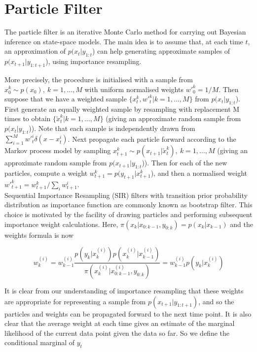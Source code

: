 \documentclass[11pt,a4,twosided,singlespacing,titlepagenumber=on]{scrreprt}
\numberwithin{equation}{chapter} %
\theoremstyle{remark}
\begin{document}
\section{Particle Filter}

The particle filter is an iterative Monte Carlo method for carrying out Bayesian inference on state-space models. The main idea is to assume that, at each time $t$, an approximation of $p(x_t|y_{1:t}$) can help generating approximate samples of $p(x_{t+1}|y_{1:t+1}$), using importance resampling.


More precisely, the procedure is initialised with a sample from $x_0^k \sim p(x_0),\ k=1,\ldots,M$ with uniform normalised weights ${w'}_0^k=1/M$. Then suppose that we have a weighted sample $\{x_t^k,{w'}_t^k|k=1,\ldots,M\}$ from $p(x_t|y_{1:t}$). First generate an equally weighted sample by resampling with replacement M times to obtain $\{\tilde{x}_t^k|k=1,\ldots,M\}$ (giving an approximate random sample from $p(x_t|y_{1:t}$)). Note that each sample is independently drawn from $\sum_{i=1}^M {w'}_t^i\delta(x-x_t^i)$. Next propagate each particle forward according to the Markov process model by sampling $x_{t+1}^k\sim p(x_{t+1}|\tilde{x}_t^k),\ k=1,\ldots,M$ (giving an approximate random sample from $p(x_{t+1}|y_{1:t}$)). Then for each of the new particles, compute a weight $w_{t+1}^k=p(y_{t+1}|x_{t+1}^k$), and then a normalised weight ${w'}_{t+1}^k=w_{t+1}^k/\sum_i w_{t+1}^i$. \\


Sequential Importance Resampling (SIR) filters with transition prior probability distribution as importance function are commonly known as bootstrap filter. This choice is motivated by the facility of drawing particles and performing subsequent importance weight calculations. Here, $\pi(x_k| x_{0:k-1}, y_{0:k}) = p(x_k|x_{k-1})$ and the weights formula is now

\begin{equation}
w_k^{(i)} = w_{k-1}^{(i)} \frac{p(y_k|x_k^{(i)})p(x_k^{(i)}|x^{(i)}_{k-1})}{\pi(x_k^{(i)}|x^{(i)}_{0:k-1},y_{0:k})}= w_{k-1}^{(i)} p(y_k|x_k^{(i)})
\end{equation}
 


It is clear from our understanding of importance resampling that these weights are appropriate for representing a sample from $p(x_{t+1}|y_{1:t+1})$, and so the particles and weights can be propagated forward to the next time point. It is also clear that the average weight at each time gives an estimate of the marginal likelihood of the current data point given the data so far. So we define the conditional marginal of $y_t$
\end{document}
